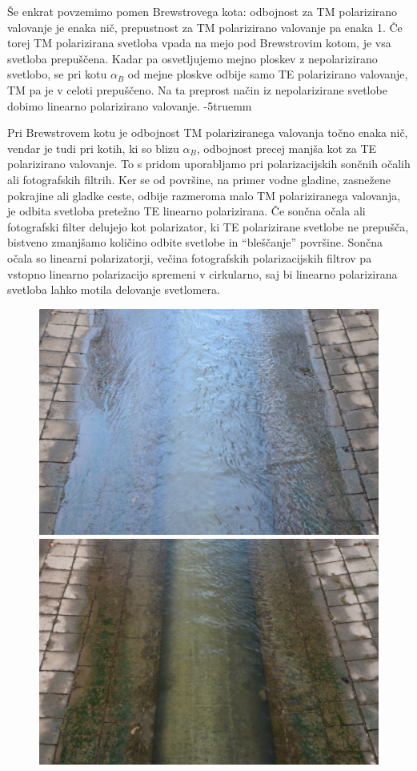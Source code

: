 Še enkrat povzemimo pomen Brewstrovega kota: odbojnost za TM polarizirano
valovanje je enaka nič, prepustnost za TM polarizirano valovanje pa enaka 1. Če 
torej TM polarizirana svetloba vpada na mejo pod Brewstrovim kotom, je vsa svetloba
prepuščena. Kadar pa o\-svet\-lju\-je\-mo mejno ploskev z nepolarizirano svetlobo, se 
pri kotu $\alpha_B$ od mejne ploskve odbije samo TE polarizirano
valovanje, TM pa je v celoti prepuščeno. Na ta preprost način
iz nepolarizirane svetlobe dobimo linearno polarizirano valovanje.
\vglue-5truemm
\begin{remark}
Pri Brewstrovem kotu je odbojnost TM polariziranega valovanja točno 
enaka nič, vendar je tudi pri kotih, ki so blizu $\alpha_B$, 
odbojnost precej manjša kot za TE polarizirano valovanje. 
To s pridom uporabljamo pri polarizacijskih sončnih očalih ali fotografskih
filtrih. Ker se od površine, na primer vodne gladine, zasnežene pokrajine
ali gladke ceste, odbije razmeroma malo TM polariziranega valovanja, 
je odbita svetloba pretežno TE linearno polarizirana. Če sončna
očala ali fotografski filter delujejo kot polarizator, ki TE polarizirane 
svetlobe ne prepušča, bistveno zmanjšamo količino odbite svetlobe in 
``bleščanje'' površine. Sončna očala so linearni polarizatorji, večina 
fotografskih polarizacijskih filtrov pa vstopno linearno polarizacijo spremeni
v cirkularno, saj bi linearno polarizirana svetloba lahko motila delovanje svetlomera.
\begin{figure}[htp]
\centering
\includegraphics[width=7truecm]{slike/04_photos_voda1.jpg}\hfill
\includegraphics[width=7truecm]{slike/04_photos_voda2.jpg}

\end{figure}
\end{remark}
